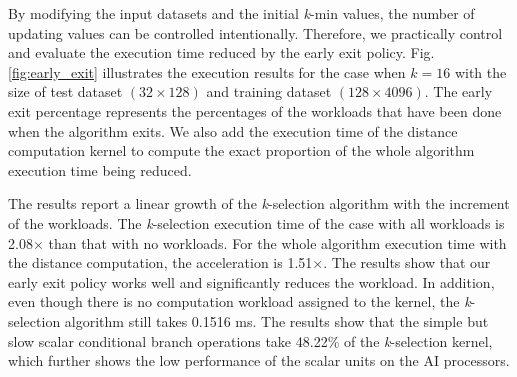 \documentclass[12pt]{extbook}
\begin{document}
\begin{figure}[htbp]
\end{figure}

By modifying the input datasets and the initial \textit{k}-min values, the number of updating values can be controlled intentionally. Therefore, we practically control and evaluate the execution time reduced by the early exit policy. Fig. \ref{fig:early_exit} illustrates the execution results for the case when $k = 16$ with the size of test dataset $(32 \times 128)$ and training dataset $(128 \times 4096)$. The early exit percentage represents the percentages of the workloads that have been done when the algorithm exits. We also add the execution time of the distance computation kernel to compute the exact proportion of the whole algorithm execution time being reduced.

The results report a linear growth of the \textit{k}-selection algorithm with the increment of the workloads. The \textit{k}-selection execution time of the case with all workloads is 2.08$\times$ than that with no workloads. For the whole algorithm execution time with the distance computation, the acceleration is 1.51$\times$. The results show that our early exit policy works well and significantly reduces the workload. In addition, even though there is no computation workload assigned to the kernel, the \textit{k}-selection algorithm still takes 0.1516 ms. The results show that the simple but slow scalar conditional branch operations take 48.22\% of the \textit{k}-selection kernel, which further shows the low performance of the scalar units on the AI processors.
\end{document}
